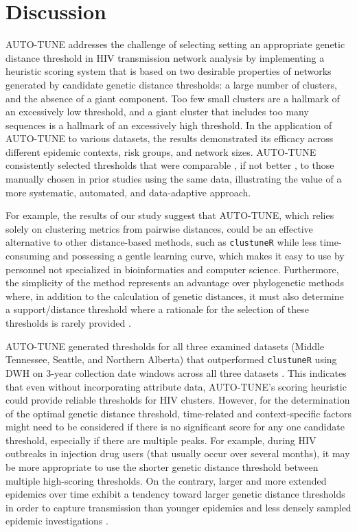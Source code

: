\documentclass[utf8]{FrontiersinHarvard} %
\newcommand{\TODO}[1]{{\color{red}{#1}}}
\begin{document}

\section{Discussion}

AUTO-TUNE addresses the challenge of selecting setting an appropriate genetic
distance threshold in HIV transmission network analysis by implementing a
heuristic scoring system that is based on two desirable properties of networks
generated by candidate genetic distance thresholds: a large number of clusters,
and the absence of a giant component. Too few small clusters are a hallmark of
an excessively low threshold, and a giant cluster that includes too many
sequences is a hallmark of an excessively high threshold. In the application of
AUTO-TUNE to various datasets, the results demonstrated its efficacy across
different epidemic contexts, risk groups, and network sizes. \TODO{Not sure
	what efficacy means} AUTO-TUNE consistently selected thresholds that were
comparable \TODO{comparable how?}, if not better \TODO{better how?}, to those
manually chosen in prior studies using the same data, illustrating the value of
a more systematic, automated, and data-adaptive approach.

For example, the results of our study suggest that AUTO-TUNE, which relies
solely on clustering metrics from pairwise distances, could be an effective
alternative to other distance-based methods, such as {\tt clustuneR} while less
time-consuming and possessing a gentle learning curve, which makes it easy to
use by personnel not specialized in bioinformatics and computer science.
Furthermore, the simplicity of the method represents an advantage over
phylogenetic methods where, in addition to the calculation of genetic
distances, it must also determine a support/distance threshold where a
rationale for the selection of these thresholds is rarely provided
\citep{junqueira_factors_2019}.

AUTO-TUNE generated thresholds for all three examined datasets (Middle
Tennessee, Seattle, and Northern Alberta) that outperformed {\tt clustuneR}
using DWH on 3-year collection date windows across all three datasets
\TODO{again, need to be clear about why higher DWH is better}. This indicates
that even without incorporating attribute data, AUTO-TUNE's scoring heuristic
could provide reliable thresholds for HIV clusters. However, for the
determination of the optimal genetic distance threshold, time-related and
context-specific factors might need to be considered if there is no significant
score for any one candidate threshold, especially if there are multiple peaks.
For example, during HIV outbreaks in injection drug users (that usually occur
over several months), it may be more appropriate to use the shorter genetic
distance threshold \citep{peters_hiv_2016,campbell_detailed_2017} between
multiple high-scoring thresholds. On the contrary, larger and more extended
epidemics over time exhibit a tendency toward larger genetic distance
thresholds in order to capture transmission than younger epidemics and less
densely sampled epidemic investigations
\citep{patil_exploring_2022,leung_molecular_2019,di_giallonardo_subtype-specific_2021}.
\end{document}
